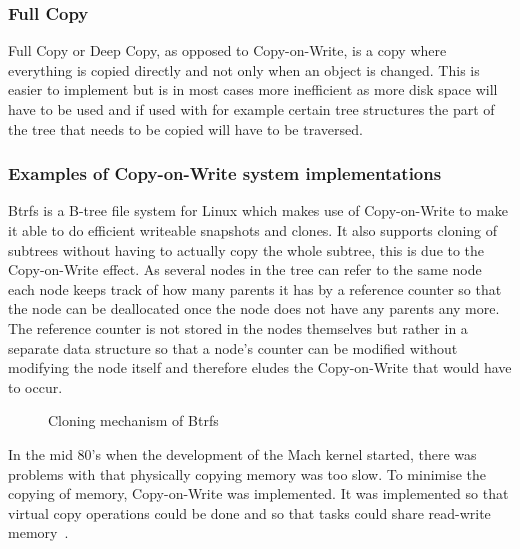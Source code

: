 \documentclass[a4paper,12pt]{article}
\newcounter{subsubsubsection}[subsubsection]
\begin{document}
\subsubsection{Full Copy}
Full Copy or Deep Copy, as opposed to Copy-on-Write, is a copy where everything is copied directly
and not only when an object is changed. This is easier to implement but is in most cases more
inefficient as more disk space will have to be used and if used with for example certain tree 
structures the part of the tree that needs to be copied will have to be traversed. 

\subsubsection{Examples of Copy-on-Write system implementations}
Btrfs is a B-tree file system for Linux which makes use of Copy-on-Write to make it able to do
efficient writeable snapshots and clones. It also supports cloning of subtrees without having to
actually copy the whole subtree, this is due to the Copy-on-Write effect. As several nodes in the
tree can refer to the same node each node keeps track of how many parents it has by a reference
counter so that the node can be deallocated once the node does not have any parents any more. The
reference counter is not stored in the nodes themselves but rather in a separate data structure so
that a node's counter can be modified without modifying the node itself and therefore eludes the
Copy-on-Write that would have to occur.

\begin{figure}[H] 
    \caption{Cloning mechanism of Btrfs~\cite{BTRFS}}
    \label{fig:btrfs_tree}
\end{figure}

In the mid 80's when the development of the Mach kernel started, there was problems with that
physically copying memory was too slow. To minimise the copying of memory, Copy-on-Write was
implemented. It was implemented so that virtual copy operations could be done and so that tasks
could share read-write memory~\cite{MACH}.
\end{document}
